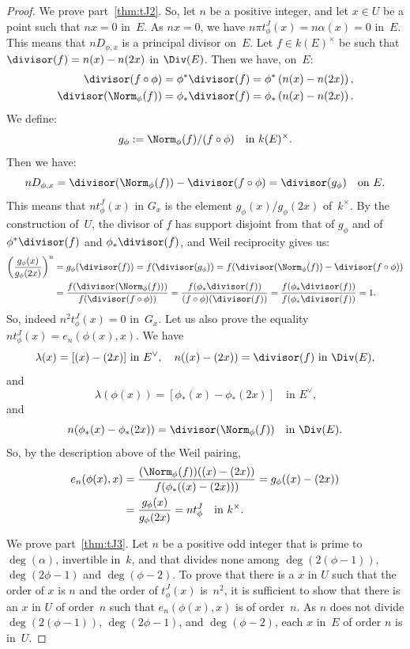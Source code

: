 \begin{proof}
We prove part~\eqref{thm:tJ2}. So, let $n$ be a positive integer, and let $x\in U$
be a point such that $nx=0$ in~$E$. As $nx=0$, we have $n\pi
t^J_\phi(x)=n \alpha(x)=0$ in~$E$. This means that $nD_{\phi,x}$ is a
principal divisor on~$E$. Let $f\in k(E)^\times$ be such that
$\divisor(f)=n(x)-n(2x)$ in $\Div(E)$. Then we have, on~$E$:
\begin{align*}
\divisor(f\circ \phi) & = \phi^*\divisor(f) = \phi^*\left(n(x)-n(2x)\right),\\
\divisor(\Norm_\phi(f)) & = \phi_*\divisor(f) = \phi_*\left(n(x)-n(2x)\right).
\end{align*}
We define:
\[
g_\phi:=\Norm_\phi(f)/(f\circ \phi)\quad\text{in $k(E)^\times$.}
\]
Then we have:
\[
nD_{\phi,x} = \divisor(\Norm_\phi(f)) - \divisor(f\circ \phi) = \divisor(g_\phi)
\quad\text{on~$E$.}
\]
This means that $nt^J_\phi(x)$ in $G_x$ is the element $g_\phi(x)/g_\phi(2x)$ of~$k^\times$. By the
construction of~$U$, the divisor of $f$ has support disjoint from that of $g_\phi$ and of
$\phi^*\divisor(f)$ and $\phi_*\divisor(f)$, and Weil reciprocity gives us:
\begin{align*}
\left(\frac{g_\phi(x)}{g_\phi(2x)}\right)^n & = g_\phi(\divisor(f)) =
f(\divisor(g_\phi)) = f(\divisor(\Norm_\phi(f)) - \divisor(f\circ \phi))\\
& = \frac{f(\divisor(\Norm_\phi(f)))}{f(\divisor(f\circ \phi))} =
\frac{f(\phi_*\divisor(f))}{(f\circ \phi)(\divisor(f))} =
\frac{f(\phi_*\divisor(f))}{f(\phi_*\divisor(f))} = 1.
\end{align*}
So, indeed $n^2 t^J_\phi(x)=0$ in~$G_x$. Let us also
prove the equality $nt^J_\phi(x) = e_n(\phi(x),x)$. We have
\[
\text{$\lambda(x) = [(x)-(2x)]$ in $E^\vee$},\quad
\text{$n((x)-(2x)) =\divisor(f)$ in $\Div(E)$,}
\]
and
\[
\lambda(\phi(x)) = [\phi_*(x)-\phi_*(2x)] \quad\text{in $E^\vee$,}
\]
and
\[
n(\phi_*(x)-\phi_*(2x)) = \divisor(\Norm_\phi(f)) \quad \text{in $\Div(E)$}.
\]
So, by the description above of the Weil pairing,
\begin{align*}
e_n(\phi(x),x) & = \frac{(\Norm_\phi(f))((x) - (2x))}{f(\phi_*((x) - (2x)))} = g_\phi((x) - (2x)) \\
& = \frac{g_\phi(x)}{g_\phi(2x)} = nt^J_\phi \quad\text{in $k^\times$.}
\end{align*}

We prove part~\eqref{thm:tJ3}. Let $n$ be a positive odd integer that is prime to
$\deg(\alpha)$, invertible in~$k$, and that divides none among
$\deg(2(\phi-1))$, $\deg(2\phi-1)$ and $\deg(\phi-2)$. To prove that
there is a $x$ in $U$ such that the order of $x$ is $n$ and the order
of $t^J_\phi(x)$ is~$n^2$, it is sufficient to show that there is an
$x$ in $U$ of order~$n$ such that $e_n(\phi(x),x)$ is of order~$n$. As
$n$ does not divide $\deg(2(\phi-1))$, $\deg(2\phi-1)$, and
$\deg(\phi-2)$, each $x$ in~$E$ of order $n$ is in~$U$.


\end{proof}
